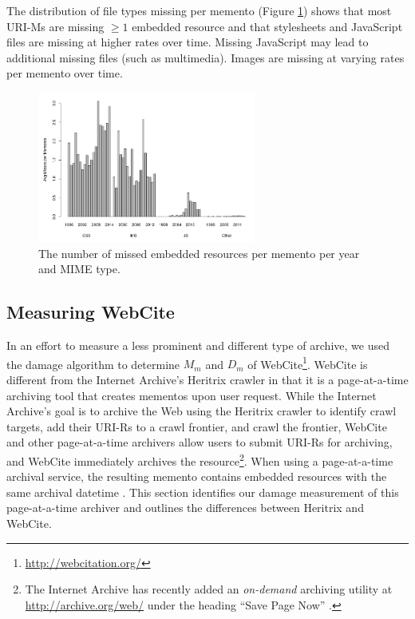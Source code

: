 The distribution of file types missing per memento (Figure \ref{occstats}) shows that most URI-Ms are missing $\ge 1$ embedded resource and that stylesheets and JavaScript files are missing at higher rates over time. Missing JavaScript may lead to additional missing files (such as multimedia). Images are missing at varying rates per memento over time.

\begin{figure}[h!]
\includegraphics[width=270px]{./imgs/fileTypes.png}
\caption{The number of missed embedded resources per memento per year and MIME type.
}
\label{occstats}
\end{figure}



\subsection{Measuring WebCite}
\label{webcite}

In an effort to measure a less prominent and different type of archive, we used the damage algorithm to determine $M_m$ and $D_m$ of WebCite\footnote{\url{http://webcitation.org/}}\cite{webcite}. WebCite is different from the Internet Archive's Heritrix crawler in that it is a page-at-a-time archiving tool that creates mementos upon user request. While the Internet Archive's goal is to archive the Web using the Heritrix crawler to identify crawl targets, add their URI-Rs to a crawl frontier, and crawl the frontier, WebCite and other page-at-a-time archivers allow users to submit URI-Rs for archiving, and WebCite immediately archives the resource\footnote{The Internet Archive has recently added an \emph{on-demand} archiving utility at \url{http://archive.org/web/} under the heading ``Save Page Now'' \cite{savePage}.}. When using a page-at-a-time archival service, the resulting memento contains embedded resources with the same archival datetime \cite{temporalCoherence}. This section identifies our damage measurement of this page-at-a-time archiver and outlines the differences between Heritrix and WebCite. 

